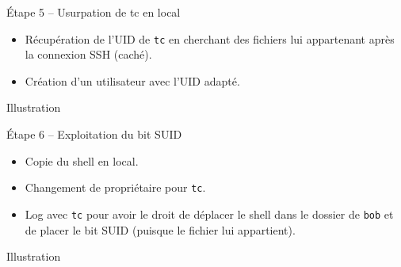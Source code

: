 \documentclass{beamer}
\begin{document}
        \begin{frame}[fragile]
            \begin{block}{Étape 5 -- Usurpation de tc en local}
                \begin{itemize}
                    \item Récupération de l'UID de \verb+tc+ en cherchant des
                        fichiers lui appartenant après la connexion SSH (caché).
                    \item Création d'un utilisateur avec l'UID adapté.
                \end{itemize}
            \end{block}
            \begin{exampleblock}{Illustration}
                \begin{center}
                \end{center}
            \end{exampleblock}
        \end{frame}

        \begin{frame}[fragile]
            \begin{block}{Étape 6 -- Exploitation du bit SUID}
                \begin{itemize}
                    \item Copie du shell en local.
                    \item Changement de propriétaire pour \verb+tc+.
                    \item Log avec \verb+tc+ pour avoir le droit de déplacer le shell
                        dans le dossier de \verb+bob+ et de placer le bit SUID
                        (puisque le fichier lui appartient).
                \end{itemize}
            \end{block}
            \begin{exampleblock}{Illustration}
                \begin{center}
                \end{center}
            \end{exampleblock}
        \end{frame}
        
\end{document}
